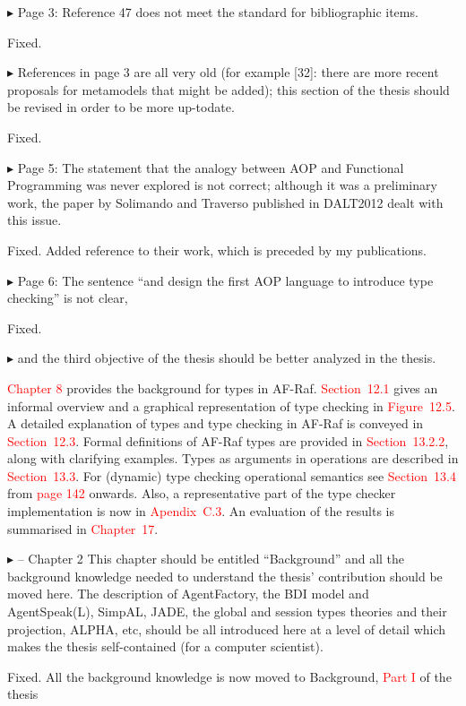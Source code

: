 \documentclass{article}
\newcommand*\R[1]{\textcolor{red}{#1}} %
\newenvironment{them}%
  {\bigskip\noindent\begingroup\color{blue}$\blacktriangleright$\enspace}%
  {\endgroup\par}
\begin{document}
\begin{them}
Page 3:
Reference 47 does not meet the standard for bibliographic items.
\end{them}
Fixed.

\begin{them}
References in page 3 are all very old (for example [32]: there are more recent
proposals for metamodels that might be added); this section of the thesis
should be revised in order to be more up-todate.
\end{them}
Fixed.

\begin{them}
Page 5:
The statement that the analogy between AOP and Functional Programming was never
explored is not correct; although it was a preliminary work, the paper by
Solimando and Traverso published in DALT2012 dealt with this issue.
\end{them}
Fixed. Added reference to their work, which is preceded by my publications.

\begin{them}
Page 6:
The sentence ``and design the first AOP language to introduce type checking'' is
not clear,
\end{them}
Fixed.

\begin{them}
and the third objective of the thesis should be better analyzed in
the thesis.
\end{them}
\R{Chapter 8} provides the background for types in AF-Raf. \R{Section~12.1}
gives an informal overview and a graphical representation of type checking in
\R{Figure~12.5}. A detailed explanation of types and type checking in AF-Raf is
conveyed in \R{Section~12.3}. Formal definitions of AF-Raf types are provided
in \R{Section~13.2.2}, along with clarifying examples. Types as arguments in
operations are described in \R{Section~13.3}. For (dynamic) type
checking operational semantics see \R{Section~13.4} from \R{page 142} onwards.
Also, a representative part of the type checker implementation is now in
\R{Apendix~C.3}. An evaluation of the results is summarised in \R{Chapter~17}.

\begin{them}
-- Chapter 2
This chapter should be entitled ``Background'' and all the background knowledge
needed to understand the thesis' contribution should be moved here. The
description of AgentFactory, the BDI model and AgentSpeak(L), SimpAL, JADE, the
global and session types theories and their projection, ALPHA, etc, should be
all introduced here at a level of detail which makes the thesis self-contained
(for a computer scientist).
\end{them}
Fixed. All the background knowledge is now moved to Background, \R{Part I} of
the thesis
\end{document}
